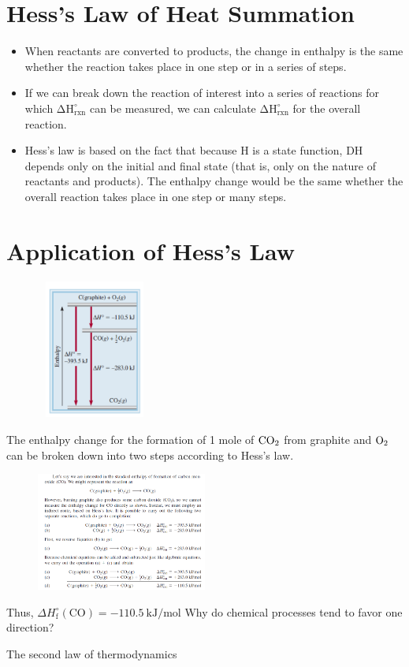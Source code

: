 \documentclass[a4paper,12pt,twocolumn]{article}
\begin{document}
\section{Hess’s Law of Heat Summation}
\begin{itemize}
\item When reactants are converted to products, the change in enthalpy is the same whether the reaction takes place in one step or in a series of steps.
\item If we can break down the reaction of interest into a series of reactions for which $\mathrm{\Delta H_{\mathrm{rxn}}^{\circ}}$ can be measured, we can calculate  $\mathrm{\Delta H_{\mathrm{rxn}}^{\circ}}$ for the overall reaction. 
\item Hess’s law is based on the fact that because H is a state function, DH depends only on the initial and final state (that is, only on the nature of reactants and products). The enthalpy change would be the same whether the overall reaction takes place in one step or many steps.
\end{itemize}

\section{Application of Hess’s Law}
\begin{figure}[h]
\centering
\includegraphics[width=1.5in,height=1.8in]{hess.png}
\end{figure}
The enthalpy change for the formation of 1 mole of $\ce{CO2}$ from graphite and $\ce{O2}$ can be broken down into two steps according to Hess’s law.
\begin{figure}[h]
\centering
\includegraphics[width=0.5\textwidth]{Screenshot 2023-03-27 005925.png}
\end{figure}
Thus, $\Delta H_{\mathrm{f}}^{\circ}(\mathrm{CO})=-110.5 \mathrm{~kJ} / \mathrm{mol}$
\newline
{\large Why do chemical processes tend to favor one direction?}
\begin{Box1}{}
The second law of thermodynamics
\end{Box1}
\end{document}
